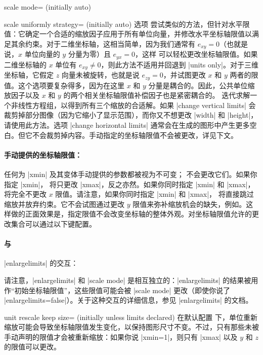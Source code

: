 \begin{pgfplotskey}{scale mode= (initially auto)}
\begin{pgfplotskey}{scale uniformly strategy= (initially auto)%
    }
        选项  尝试类似的方法，但针对水平限值：它确定一个合适的缩放因子应用于所有单位向量，并修改水平坐标轴限值以满足其余约束。对于二维坐标轴，这相当简单，因为我们通常有 $e_{xy} = 0$（也就是说，$x$ 单位向量的 $y$ 分量为零）且 $e_{yx}=0$，这样 \PGFPlots{} 可以轻松更改坐标轴限值。如果二维坐标轴的 $x$ 单位有 $e_{xy} \neq 0$，则此方法不适用并回退到 |units only|。对于三维坐标轴，它假定 $z$ 向量未被旋转，也就是说 $e_{zy} = 0$，并试图更改 $x$ 和 $y$ 两者的限值。这个选项要复杂得多，因为在这里 $x$ 和 $y$ 分量是耦合的。因此，公共单位缩放因子以及 $x$ 和 $y$ 的两个相关坐标轴限值补偿因子也是紧密耦合的。\PGFPlots{} 迭代求解一个非线性方程组，以得到所有三个缩放的合适解。如果 |change vertical limits| 会裁剪掉部分图像（因为它缩小了显示范围），而你又不想更改 |width| 和 |height|，请使用此方法。选项 |change horizontal limits| 通常会在生成的图形中产生更多空白。但它不会裁剪掉内容。手动指定的坐标轴限值不会被更改，详见下文。
    \end{pgfplotskey}


    \paragraph{手动提供的坐标轴限值：}

    任何为 |xmin| 及其变体手动提供的参数都被视为不可变；\PGFPlots{} 不会更改它们。如果你指定 |xmin|，\PGFPlots{} 将只更改 |xmax|，反之亦然。如果你同时指定 |xmin| 和 |xmax|，\PGFPlots{} 将完全不更改 $x$ 限值。请注意，如果你同时指定 |xmin| 和 |xmax|，\PGFPlots{} 将直接跳过缩放并放弃约束。它不会试图通过更改 $y$ 限值来弥补缩放机会的缺失，例如。这样做的正面效果是，指定限值不会改变坐标轴的整体外观。对坐标轴限值允许的更改集合可以通过以下键配置。


    \paragraph{与 }|enlargelimits| 的交互：

    请注意，|enlargelimits| 和 |scale mode| 是相互独立的：|enlargelimits| 的结果被用作“初始坐标轴限值”，这些限值可能会被 |scale mode| 更改（即使你说了 |enlargelimits=false|）。关于这种交互的详细信息，参见 |enlargelimits| 的文档。

    \begin{pgfplotskey}{unit rescale keep size= (initially unless limits declared)%
    }
        在默认配置  下，单位重新缩放可能会导致坐标轴限值发生变化，以保持图形尺寸不变。不过，只有那些未被手动声明的限值才会被重新缩放：如果你说 |xmin=1|，则只有 |xmax| 以及 $y$ 和 $z$ 的限值可以更改。


\end{pgfplotskey}
\end{pgfplotskey}

